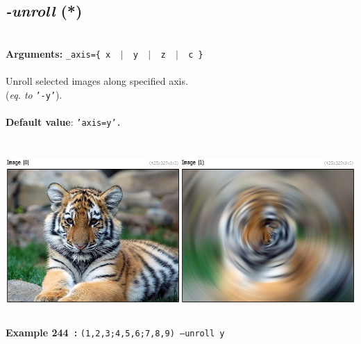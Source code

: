 \documentclass[a4paper,11pt,twoside]{book}
\begin{document}
\subsection{\emph{-unroll} (*)}\vspace*{-0.5em}
~\\\textbf{Arguments: } 
{\small \texttt{\_axis=\{ x ~$|$~ y ~$|$~ z ~$|$~ c \}}}\\~\\
Unroll selected images along specified axis.
~\\(\emph{eq. to} {\small \texttt{'-y'}}).
~\\~\\\textbf{Default value}: {\small \texttt{'axis=y'.}}
\begin{center}\includegraphics[keepaspectratio=true,height=7cm,width=\textwidth]{img/gmic_def244.jpg}\\
{\footnotesize \textbf{Example 244~:} \texttt{(1,2,3;4,5,6;7,8,9) --unroll y}}
\end{center}
\end{document}
